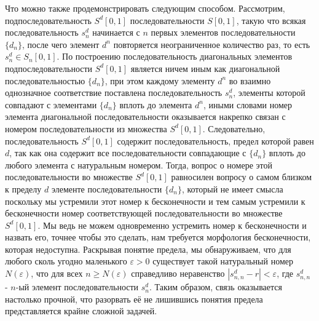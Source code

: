 \documentclass[12pt]{article}
\begin{document}
Что можно также продемонстрировать следующим способом. Рассмотрим, подпоследовательность $S^d[0, 1]$ последовательности $S[0, 1]$, такую что всякая последовательность $s^d_n$ начинается с $n$ первых элементов последовательности $\{d_n\}$, после чего элемент $d^n$ повторяется неограниченное количество раз, то есть $s^d_n \in S_n[0, 1]$. По построению последовательность диагональных элементов подпоследовательности $S^d[0, 1]$ является ничем иным как диагональной последовательностью $\{d_n\}$, при этом каждому элементу $d^n$ во взаимно однозначное соответствие поставлена последовательность $s^d_n$, элементы которой совпадают с элементами $\{d_n\}$ вплоть до элемента $d^n$, иными словами номер элемента диагональной последовательности оказывается накрепко связан с номером последовательности из множества $S^d[0, 1]$. Следовательно, последовательность $S^d[0, 1]$ содержит последовательность, предел которой равен $d$, так как она содержит все последовательности совпадающие с $\{d_n\}$ вплоть до любого элемента с натуральным номером. Тогда, вопрос о номере этой последовательности во множестве $S^d[0, 1]$ равносилен вопросу о самом близком к пределу $d$ элементе последовательности $\{d_n\}$, который не имеет смысла поскольку мы устремили этот номер к бесконечности и тем самым устремили к бесконечности номер соответствующей последовательности во множестве $S^d[0, 1]$. Мы ведь не можем одновременно устремить номер к бесконечности и назвать его, точнее чтобы это сделать, нам требуется морфология бесконечности, которая недоступна. Раскрывая понятие предела, мы обнаруживаем, что для любого сколь угодно маленького $\varepsilon > 0$ существует такой натуральный номер $N(\varepsilon)$, что для всех $n \geq N(\varepsilon)$ справедливо неравенство $|s^d_{n, n} - r| < \varepsilon$, где $s^d_{n, n}$ - $n$-ый элемент последовательности $s^d_n$. Таким образом, связь оказывается настолько прочной, что разорвать её не лишившись понятия предела представляется крайне сложной задачей.
\end{document}
